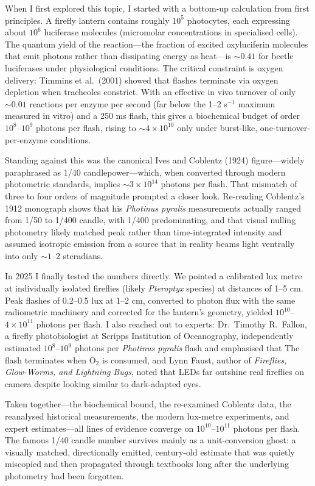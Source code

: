 \begin{commentary}
When I first explored this topic, I started with a bottom-up calculation from first principles. A firefly lantern contains roughly $10^5$ photocytes, each expressing about $10^6$ luciferase molecules (micromolar concentrations in specialised cells). The quantum yield of the reaction—the fraction of excited oxyluciferin molecules that emit photons rather than dissipating energy as heat—is $\sim 0.41$ for beetle luciferases under physiological conditions. The critical constraint is oxygen delivery: Timmins et al.\ (2001) showed that flashes terminate via oxygen depletion when tracheoles constrict. With an effective in vivo turnover of only $\sim 0.01$ reactions per enzyme per second (far below the 1–2 s$^{-1}$ maximum measured in vitro) and a 250 ms flash, this gives a biochemical budget of order $10^8$–$10^9$ photons per flash, rising to $\sim 4 \times 10^{10}$ only under burst-like, one-turnover-per-enzyme conditions.

Standing against this was the canonical Ives and Coblentz (1924) figure—widely paraphrased as \QENOpen{}1/40 candlepower\QENClose{}—which, when converted through modern photometric standards, implies $\sim 3 \times 10^{14}$ photons per flash. That mismatch of three to four orders of magnitude prompted a closer look. Re-reading Coblentz's 1912 monograph shows that his \textit{Photinus pyralis} measurements actually ranged from 1/50 to 1/400 candle, with 1/400 predominating, and that visual nulling photometry likely matched peak rather than time-integrated intensity and assumed isotropic emission from a source that in reality beams light ventrally into only $\sim 1$–2 steradians.

In 2025 I finally tested the numbers directly. We pointed a calibrated lux metre at individually isolated fireflies (likely \textit{Pteroptyx} species) at distances of 1–5 cm. Peak flashes of 0.2–0.5 lux at 1–2 cm, converted to photon flux with the same radiometric machinery and corrected for the lantern's geometry, yielded $10^{10}$–$4 \times 10^{11}$ photons per flash. I also reached out to experts: Dr.\ Timothy R.\ Fallon, a firefly photobiologist at Scripps Institution of Oceanography, independently estimated $10^8$–$10^9$ photons per \textit{Photinus pyralis} flash and emphasised that \QSOpen{}The flash terminates when O$_2$ is consumed,\QSClose{} and Lynn Faust, author of \textit{Fireflies, Glow-Worms, and Lightning Bugs}, noted that LEDs far outshine real fireflies on camera despite looking similar to dark-adapted eyes.

Taken together—the biochemical bound, the re-examined Coblentz data, the reanalysed historical measurements, the modern lux-metre experiments, and expert estimates—all lines of evidence converge on $10^{10}$–$10^{11}$ photons per flash. The famous \QENOpen{}1/40 candle\QENClose{} number survives mainly as a unit-conversion ghost: a visually matched, directionally emitted, century-old estimate that was quietly miscopied and then propagated through textbooks long after the underlying photometry had been forgotten.
\end{commentary}


